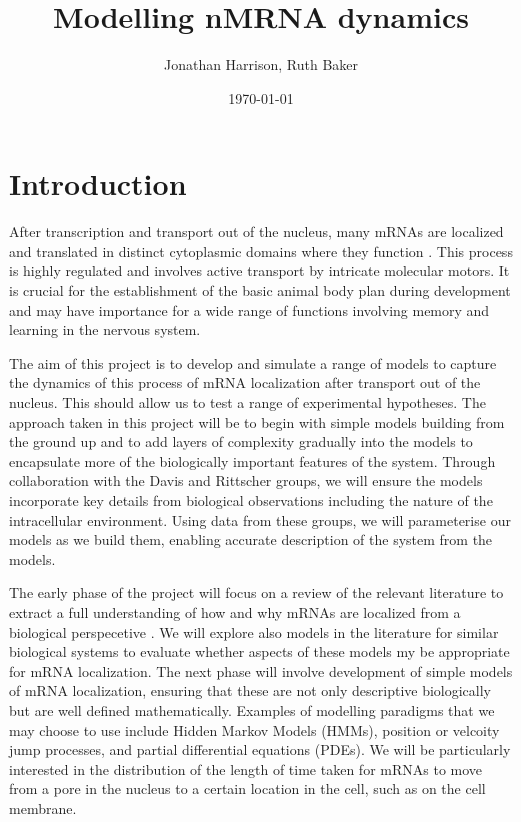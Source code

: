 \documentclass[12pt]{article}
\begin{document}
\title{Modelling nMRNA dynamics}
\author{Jonathan Harrison, Ruth Baker}
\date{\today}


\maketitle


\section{Introduction}




After transcription and transport out of the nucleus, many mRNAs are localized and translated in distinct cytoplasmic domains where they function  \cite{jansen2001mrna}. 
This process is highly regulated and involves active transport by intricate molecular motors.
It is crucial for the establishment of the basic animal body plan during development and may have importance for a wide range of functions involving memory and learning in the nervous system. 

The aim of this project is to develop and simulate a range of models to capture the dynamics of this process of mRNA localization after transport out of the nucleus.
This should allow us to test a range of experimental hypotheses. 
The approach taken in this project will be to begin with simple models building from the ground up and to add layers of complexity gradually into the models to encapsulate more of the biologically important features of the system.
Through collaboration with the Davis and Rittscher groups, we will ensure the models incorporate key details from biological observations including the nature of the intracellular environment.
Using data from these groups, we will parameterise our models as we build them, enabling accurate description of the system from the models. 

The early phase of the project will focus on a review of the relevant literature to extract a full understanding of how and why mRNAs are localized from a biological perspecetive \cite{parton2014subcellular, buxbaum2014right}.
We will explore also models in the literature for similar biological systems \cite{isaacson2011influence} to evaluate whether aspects of these models my be appropriate for mRNA localization. 
The next phase will involve development of simple models of mRNA localization, ensuring that these are not only descriptive biologically but are well defined mathematically.
Examples of modelling paradigms that we may choose to use include Hidden Markov Models (HMMs), position or velcoity jump processes, and partial differential equations (PDEs).
We will be particularly interested in the distribution of the length of time taken for mRNAs to move from a pore in the nucleus to a certain location in the cell, such as on the cell membrane. 
\end{document}
